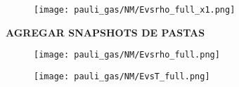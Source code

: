 \begin{figure}[H]
	\centering
	\texttt{[image: pauli\_gas/NM/Evsrho\_full\_x1.png]}
	\caption{}
	\label{fig:Evsrho_QCNMx1}
\end{figure}

\textbf{AGREGAR SNAPSHOTS DE PASTAS}

\begin{figure}[H]
\centering
\texttt{[image: pauli\_gas/NM/Evsrho\_full.png]}
\caption{}
\label{fig:Evsrho_QCNMx0,5}
\end{figure}

\begin{figure}[H]
	\centering
	\texttt{[image: pauli\_gas/NM/EvsT\_full.png]}
	\caption{}
	\label{fig:EvsT_QCNMx0,5}
\end{figure}
